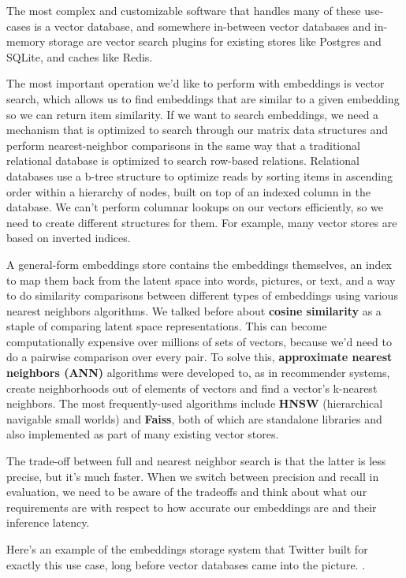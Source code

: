 \documentclass[11pt, table]{diazessay} %
\begin{document}
\begin{sloppypar}
The most complex and customizable software that handles many of these use-cases is a vector database, and somewhere in-between vector databases and in-memory storage are vector search plugins for existing stores like Postgres and SQLite, and caches like Redis.

The most important operation we'd like to perform with embeddings is vector search, which allows us to find embeddings that are similar to a given embedding so we can return item similarity. If we want to search embeddings, we need a mechanism that is optimized to search through our matrix data structures and perform nearest-neighbor comparisons in the same way that a traditional relational database is optimized to search row-based relations. Relational databases use a b-tree structure to optimize reads by sorting items in ascending order within a hierarchy of nodes, built on top of an indexed column in the database. We can't perform columnar lookups on our vectors efficiently, so we need to create different structures for them. For example, many vector stores are based on inverted indices.

A general-form embeddings store contains the embeddings themselves, an index to map them back from the latent space into words, pictures, or text, and a way to do similarity comparisons between different types of embeddings using various nearest neighbors algorithms. We talked before about \textbf{cosine similarity} as a staple of comparing latent space representations. This can become computationally expensive over millions of sets of vectors, because we'd need to do a pairwise comparison over every pair. To solve this, \textbf{approximate nearest neighbors (ANN)} algorithms were developed to, as in recommender systems, create neighborhoods out of elements of vectors and find a vector's k-nearest neighbors. The most frequently-used algorithms include \textbf{HNSW} (hierarchical navigable small worlds) and \textbf{Faiss}, both of which are standalone libraries and also implemented as part of many existing vector stores.

The trade-off between full and nearest neighbor search is that the latter is less precise, but it's much faster. When we switch between precision and recall in evaluation, we need to be aware of the tradeoffs and think about what our requirements are with respect to how accurate our embeddings are and their inference latency.

Here's an example of the embeddings storage system that Twitter built for exactly this use case, long before vector databases came into the picture.  \citep{shiebler2010making}.


\end{sloppypar}
\end{document}
